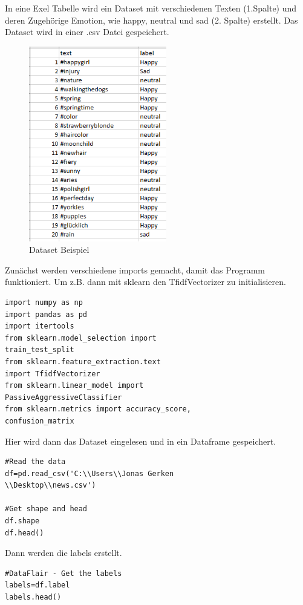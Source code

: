 \documentclass[conference]{IEEEtran}
\begin{document}
In eine Exel Tabelle wird ein Dataset mit verschiedenen Texten (1.Spalte) und deren Zugehörige Emotion, wie happy, neutral und sad (2. Spalte) erstellt. Das Dataset wird in einer .csv Datei gespeichert.
\begin{figure}[h]
	\centering
	\includegraphics[width=6cm]{Dataset}
	\caption{Dataset Beispiel}
\end{figure}

Zunächst werden verschiedene imports gemacht, damit das Programm funktioniert. Um z.B. dann mit sklearn den TfidfVectorizer zu initialisieren.
\begin{lstlisting}
import numpy as np
import pandas as pd
import itertools
from sklearn.model_selection import 
train_test_split
from sklearn.feature_extraction.text 
import TfidfVectorizer
from sklearn.linear_model import 
PassiveAggressiveClassifier
from sklearn.metrics import accuracy_score,
confusion_matrix
\end{lstlisting}

Hier wird dann das Dataset eingelesen und in ein Dataframe gespeichert.
\begin{lstlisting}
#Read the data
df=pd.read_csv('C:\\Users\\Jonas Gerken
\\Desktop\\news.csv')

#Get shape and head
df.shape
df.head()
\end{lstlisting}


Dann werden die labels erstellt.
\begin{lstlisting}
#DataFlair - Get the labels
labels=df.label
labels.head()
\end{lstlisting}
\end{document}

